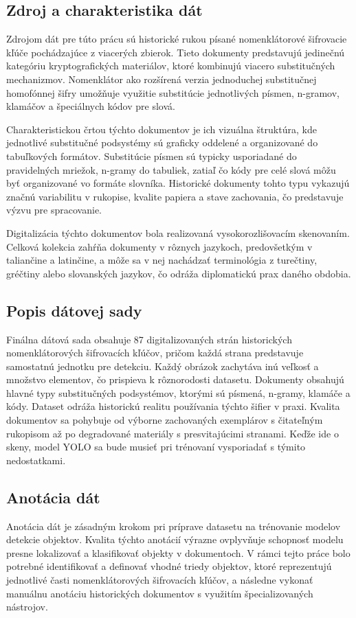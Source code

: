     \subsection{Zdroj a charakteristika dát}
    Zdrojom dát pre túto prácu sú historické rukou písané nomenklátorové šifrovacie kľúče pochádzajúce z viacerých zbierok. Tieto dokumenty predstavujú jedinečnú kategóriu kryptografických materiálov, ktoré kombinujú viacero substitučných mechanizmov. Nomenklátor ako rozšírená verzia jednoduchej substitučnej homofónnej šifry umožňuje využitie substitúcie jednotlivých písmen, n-gramov, klamáčov a špeciálnych kódov pre slová.
    
    Charakteristickou črtou týchto dokumentov je ich vizuálna štruktúra, kde jednotlivé substitučné podsystémy sú graficky oddelené a organizované do tabuľkových formátov. Substitúcie písmen sú typicky usporiadané do pravidelných mriežok, n-gramy do tabuliek, zatiaľ čo kódy pre celé slová môžu byť organizované vo formáte slovníka. Historické dokumenty tohto typu vykazujú značnú variabilitu v rukopise, kvalite papiera a stave zachovania, čo predstavuje výzvu pre spracovanie.
    
    Digitalizácia týchto dokumentov bola realizovaná vysokorozlišovacím skenovaním. Celková kolekcia zahŕňa dokumenty v rôznych jazykoch, predovšetkým v taliančine a latinčine, a môže sa v nej nachádzať terminológia z turečtiny, gréčtiny alebo slovanských jazykov, čo odráža diplomatickú prax daného obdobia.
    \subsection{Popis dátovej sady}
    Finálna dátová sada obsahuje 87 digitalizovaných strán historických nomenklátorových šifrovacích kľúčov, pričom každá strana predstavuje samostatnú jednotku pre detekciu. Každý obrázok zachytáva inú veľkosť a množstvo elementov, čo prispieva k rôznorodosti datasetu.
    Dokumenty obsahujú hlavné typy substitučných podsystémov, ktorými sú písmená, n-gramy, klamáče a kódy. Dataset odráža historickú realitu používania týchto šifier v praxi.
    Kvalita dokumentov sa pohybuje od výborne zachovaných exemplárov s čitateľným rukopisom až po degradované materiály s presvitajúcimi stranami. Keďže ide o skeny, model YOLO sa bude musieť pri trénovaní vysporiadať s týmito nedostatkami.
    \subsection{Anotácia dát}
    Anotácia dát je zásadným krokom pri príprave datasetu na trénovanie modelov detekcie objektov. Kvalita týchto anotácií výrazne ovplyvňuje schopnosť modelu presne lokalizovať a klasifikovať objekty v dokumentoch. V rámci tejto práce bolo potrebné identifikovať a definovať vhodné triedy objektov, ktoré reprezentujú jednotlivé časti nomenklátorových šifrovacích kľúčov, a následne vykonať manuálnu anotáciu historických dokumentov s využitím špecializovaných nástrojov.

